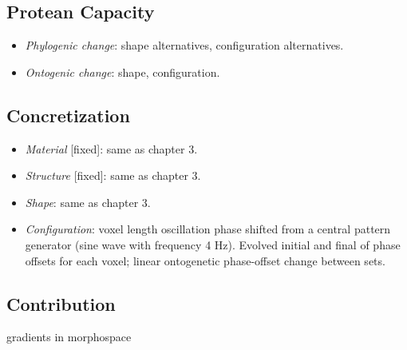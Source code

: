 \subsection{Protean Capacity}

\begin{itemize}
    \item \textit{Phylogenic change}: shape alternatives, configuration alternatives.
    \item \textit{Ontogenic change}: shape, configuration.
\end{itemize}


\subsection{Concretization}

\begin{itemize}
    \item \textit{Material} [fixed]: same as chapter 3.
    \item \textit{Structure} [fixed]: same as chapter 3.
    \item \textit{Shape}: same as chapter 3.
    \item \textit{Configuration}: voxel length oscillation phase shifted from a central pattern generator (sine wave with frequency 4 Hz).
    Evolved initial and final of phase offsets for each voxel; linear ontogenetic phase-offset change between sets.
\end{itemize}





\subsection{Contribution}

gradients in morphospace

